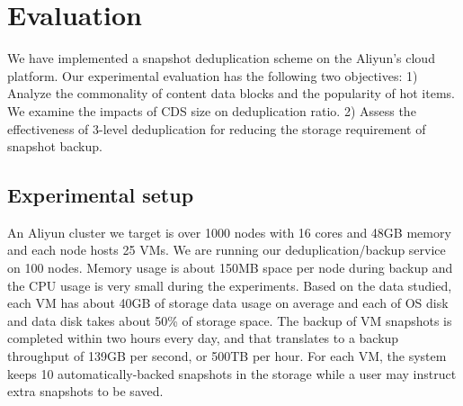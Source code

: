 
\section{Evaluation}
\label{sect:exper}

We have implemented a snapshot deduplication scheme on the Aliyun's cloud platform.
Our experimental evaluation has the following two objectives:
1) Analyze the commonality of content data blocks and the popularity  of hot items. We 
examine the impacts of CDS size on deduplication ratio.
2) Assess the effectiveness  of 3-level deduplication for reducing the storage requirement of snapshot 
backup. 

\subsection{Experimental setup}

An Aliyun cluster we target is over 1000 nodes with 16 cores and 48GB memory
and each node hosts 25 VMs.
We are running our deduplication/backup  service on 100 nodes.
Memory usage is about 150MB space per node during backup and
the CPU usage is very small during the experiments. 
Based on the data studied,  each VM has about  40GB of storage  data usage on average
and each of OS disk and data disk takes about 50\% of storage space.
The backup of VM snapshots is completed within two hours  every day,
and that translates to a backup throughput of 139GB per second, or 500TB per hour.
For each VM, the system keeps  10 automatically-backed snapshots in the storage while
a user may instruct extra snapshots to be saved.



